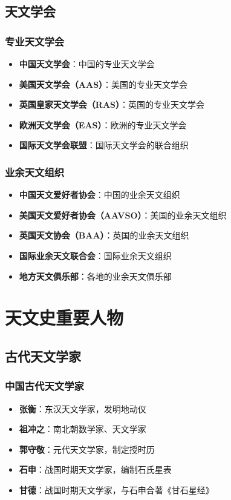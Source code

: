 \documentclass[12pt,UTF8]{ctexbook}
\begin{document}
\chapter{天文学会}
\section{专业天文学会}

\begin{itemize}
  \item \textbf{中国天文学会}：中国的专业天文学会
  \item \textbf{美国天文学会（AAS）}：美国的专业天文学会
  \item \textbf{英国皇家天文学会（RAS）}：英国的专业天文学会
  \item \textbf{欧洲天文学会（EAS）}：欧洲的专业天文学会
  \item \textbf{国际天文学会联盟}：国际天文学会的联合组织
\end{itemize}

\section{业余天文组织}

\begin{itemize}
  \item \textbf{中国天文爱好者协会}：中国的业余天文组织
  \item \textbf{美国天文爱好者协会（AAVSO）}：美国的业余天文组织
  \item \textbf{英国天文协会（BAA）}：英国的业余天文组织
  \item \textbf{国际业余天文联合会}：国际业余天文组织
  \item \textbf{地方天文俱乐部}：各地的业余天文俱乐部
\end{itemize}

\part{天文史重要人物}

\chapter{古代天文学家}
\section{中国古代天文学家}

\begin{itemize}
  \item \textbf{张衡}：东汉天文学家，发明地动仪
  \item \textbf{祖冲之}：南北朝数学家、天文学家
  \item \textbf{郭守敬}：元代天文学家，制定授时历
  \item \textbf{石申}：战国时期天文学家，编制石氏星表
  \item \textbf{甘德}：战国时期天文学家，与石申合著《甘石星经》
\end{itemize}
\end{document}
